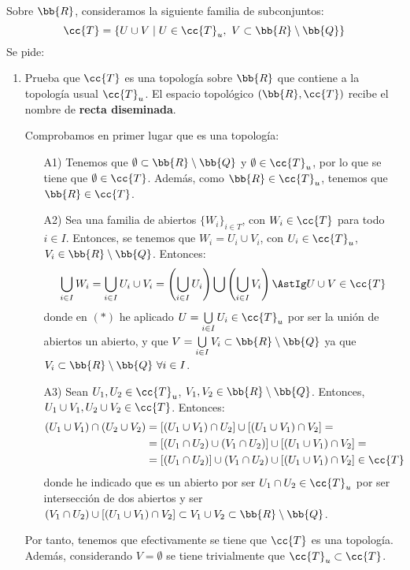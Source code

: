 \begin{ejercicio}\label{ej:3.1.16}
    Sobre $\bb{R}$, consideramos la siguiente familia de subconjuntos:
    \begin{equation*}
        \cc{T}=\{U\cup V\mid U\in \cc{T}_u,~V\subset \bb{R}\setminus \bb{Q}\}
    \end{equation*}
    Se pide:
    \begin{enumerate}[label=\alph*)]
        \item Prueba que $\cc{T}$ es una topología sobre $\bb{R}$ que contiene a la topología usual $\cc{T}_u$. El espacio topológico $(\bb{R},\cc{T})$ recibe el nombre de \textbf{recta diseminada}.

        Comprobamos en primer lugar que es una topología:
        \begin{enumerate}
            \item[A1)] Tenemos que $\emptyset\subset \bb{R}\setminus \bb{Q}$ y $\emptyset\in \cc{T}_u$, por lo que se tiene que $\emptyset\in \cc{T}$. Además, como $\bb{R}\in \cc{T}_u$, tenemos que $\bb{R}\in \cc{T}$.
            
            \item[A2)] Sea una familia de abiertos $\{W_i\}_{i\in T}$, con $W_i\in \cc{T}$ para todo $i\in I$. Entonces, se tenemos que $W_i=U_i\cup V_i$, con $U_i\in \cc{T}_u$, $V_i\in \bb{R}\setminus\bb{Q}$. Entonces:
            \begin{equation*}
                \bigcup_{i\in I}W_i = \bigcup_{i\in I} U_i\cup V_i = \left(\bigcup_{i\in I}U_i\right) \bigcup \left(\bigcup_{i\in I}V_i\right)  \AstIg U\cup V\in \cc{T}
            \end{equation*}
            donde en $(\ast)$ he aplicado $U=\bigcup\limits_{i\in I}U_i\in \cc{T}_u$ por ser la unión de abiertos un abierto, y que $V=\bigcup\limits_{i\in I}V_i\subset \bb{R}\setminus \bb{Q}$ ya que $V_i\subset \bb{R}\setminus \bb{Q}~\forall i\in I$.
            
            \item[A3)] Sean $U_1,U_2\in \cc{T}_u$, $V_1,V_2\in \bb{R}\setminus \bb{Q}$. Entonces, $U_1\cup V_1,U_2\cup V_2\in \cc{T}$. Entonces:
            \begin{equation*}\begin{split}
                (U_1\cup V_1)\cap (U_2\cup V_2) &= [(U_1\cup V_1)\cap U_2] \cup [(U_1\cup V_1)\cap V_2]
                =\\&= [(U_1\cap U_2)\cup (V_1\cap U_2)] \cup [(U_1\cup V_1)\cap V_2]
                =\\&= [(U_1\cap U_2)]\cup (V_1\cap U_2) \cup [(U_1\cup V_1)\cap V_2]
                \in \cc{T}
            \end{split}\end{equation*}
            donde he indicado que es un abierto por ser $U_1\cap U_2\in \cc{T}_u$ por ser intersección de dos abiertos y ser $(V_1\cap U_2) \cup [(U_1\cup V_1)\cap V_2]\subset V_1\cup V_2\subset \bb{R}\setminus \bb{Q}$.
        \end{enumerate}
        Por tanto, tenemos que efectivamente se tiene que $\cc{T}$ es una topología. Además, considerando $V=\emptyset$ se tiene trivialmente que $\cc{T}_u\subset \cc{T}$.


\end{enumerate}
\end{ejercicio}
